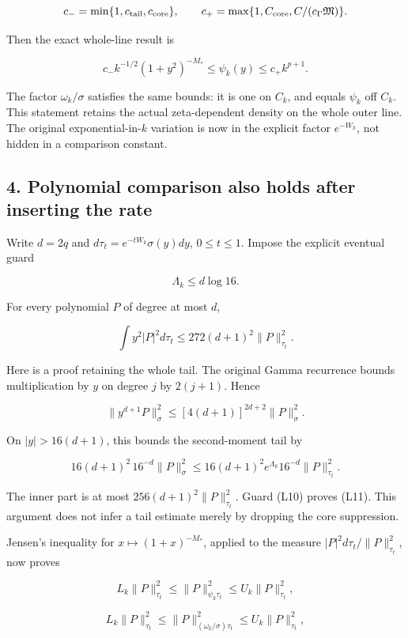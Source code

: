 \[
c_- =\min\{1,c_{\rm tail},c_{\rm core}\},\qquad
c_+=\max\{1,C_{\rm core},C/(c_\Gamma\mathfrak M)\}.
\]

Then the exact whole-line result is

\[
\boxed{c_-k^{-1/2}(1+y^2)^{-M_*}\le\psi_k(y)
\le c_+k^{p+1}.}
\tag{L9}
\]

The factor \(\omega_k/\sigma\) satisfies the same bounds: it is one on \(C_k\), and equals \(\psi_k\) off \(C_k\). This statement retains the actual zeta-dependent density on the whole outer line. The original exponential-in-\(k\) variation is now in the explicit factor \(e^{-W_k}\), not hidden in a comparison constant.

\subsection{4. Polynomial comparison also holds after inserting the rate}\label{polynomial-comparison-also-holds-after-inserting-the-rate}

Write \(d=2q\) and \(d\tau_t=e^{-tW_k}\sigma(y)dy\), \(0\le t\le1\). Impose the explicit eventual guard

\[
\Lambda_k\le d\log16.
\tag{L10}
\]

For every polynomial \(P\) of degree at most \(d\),

\[
\boxed{\int y^2|P|^2d\tau_t\le272(d+1)^2\|P\|_{\tau_t}^2.}
\tag{L11}
\]

Here is a proof retaining the whole tail. The original Gamma recurrence bounds multiplication by \(y\) on degree \(j\) by \(2(j+1)\). Hence

\[
\|y^{d+1}P\|_\sigma^2\le[4(d+1)]^{2d+2}\|P\|_\sigma^2.
\]

On \(|y|>16(d+1)\), this bounds the second-moment tail by

\[
16(d+1)^2\,16^{-d}\|P\|_\sigma^2
\le16(d+1)^2e^{\Lambda_k}16^{-d}\|P\|_{\tau_t}^2.
\]

The inner part is at most \(256(d+1)^2\|P\|_{\tau_t}^2\). Guard (L10) proves (L11). This argument does not infer a tail estimate merely by dropping the core suppression.

Jensen's inequality for \(x\mapsto(1+x)^{-M_*}\), applied to the measure \(|P|^2d\tau_t/\|P\|_{\tau_t}^2\), now proves

\[
L_k\|P\|_{\tau_t}^2\le\|P\|_{\psi_k\tau_t}^2
\le U_k\|P\|_{\tau_t}^2,
\]

\[
L_k\|P\|_{\tau_t}^2\le\|P\|_{(\omega_k/\sigma)\tau_t}^2
\le U_k\|P\|_{\tau_t}^2,
\tag{L12}
\]


